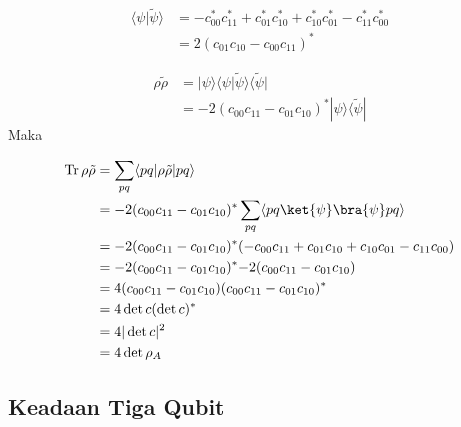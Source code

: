 \begin{equation}
	\begin{aligned}
		\langle \psi | \tilde{\psi} \rangle
		&= -c^{*}_{00} c^{*}_{11}
		+ c^{*}_{01} c^{*}_{10}
		+ c^{*}_{10} c^{*}_{01}
		- c^{*}_{11} c^{*}_{00}\\
		&= 2 (c_{01} c_{10} - c_{00} c_{11})^{*}
	\end{aligned}
\end{equation}

\begin{equation}
	\begin{aligned}
		\rho \tilde{\rho}
		&= |\psi\rangle \langle\psi| \tilde{\psi}\rangle \langle\tilde{\psi}|\\
		&= -2 (c_{00} c_{11} - c_{01} c_{10})^{*}
		|\psi\rangle \langle\tilde{\psi}|
	\end{aligned}
\end{equation}
Maka

\begin{equation}
	\begin{aligned}
		\mathrm{Tr}\,\rho \tilde{\rho}
		&= \sum_{p q} \langle p q | \rho \tilde{\rho} | p q \rangle\\
		&= -2(c_{00}c_{11}-c_{01}c_{10})^{*} \sum_{p q} \langle p q \ket{\psi}\bra{\psi} p q \rangle\\
		&=-2(c_{00} c_{11} - c_{01} c_{10})^{*}(-c_{00}c_{11}+c_{01}c_{10}+c_{10}c_{01}-c_{11}c_{00})\\
		&=-2(c_{00} c_{11} - c_{01} c_{10})^{*} {-2(c_{00} c_{11} - c_{01} c_{10})}\\
		&= 4 (c_{00} c_{11} - c_{01} c_{10})
		(c_{00} c_{11} - c_{01} c_{10})^{*}\\
		&= 4 \det c (\det c)^{*}\\
		&= 4 |\det c|^2\\
		&= 4 \det \rho_A
	\end{aligned}
\end{equation}

\subsection{Keadaan Tiga Qubit}


